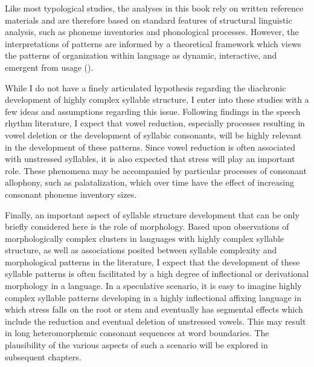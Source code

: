   Like most typological studies, the analyses in this book rely on written reference materials and are therefore based on standard features of structural linguistic analysis, such as phoneme inventories and phonological processes. However, the interpretations of patterns are informed by a theoretical framework which views the patterns of organization within language as dynamic, interactive, and emergent from usage (\citealt{BecknerEtAl2009,Bybee2001,Bybee2010}).

  While I do not have a finely articulated hypothesis regarding the diachronic development of highly complex syllable structure, I enter into these studies with a few ideas and assumptions regarding this issue. Following findings in the speech rhythm literature, I expect that vowel reduction, especially processes resulting in vowel deletion or the development of syllabic consonants, will be highly relevant in the development of these patterns. Since vowel reduction is often associated with unstressed syllables, it is also expected that stress will play an important role. These phenomena may be accompanied by particular processes of consonant allophony, such as palatalization, which over time have the effect of increasing consonant phoneme inventory sizes. 
  
  Finally, an important aspect of syllable structure development that can be only briefly considered here is the role of morphology. Based upon observations of morphologically complex clusters in languages with highly complex syllable structure, as well as associations posited between syllable complexity and morphological patterns in the literature, I expect that the development of these syllable patterns is often facilitated by a high degree of inflectional or derivational morphology in a language. In a speculative scenario, it is easy to imagine highly complex syllable patterns developing in a highly inflectional affixing language in which stress falls on the root or stem and eventually has segmental effects which include the reduction and eventual deletion of unstressed vowels. This may result in long heteromorphemic consonant sequences at word boundaries. The plausibility of the various aspects of such a scenario will be explored in subsequent chapters.

